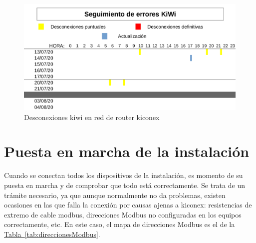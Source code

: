 \clearpage
\vspace*{\fill}
\begin{figure}[H]
  \centering
  \includegraphics[width=\textwidth, keepaspectratio]{img/erroresRedRouter}
  \caption{Desconexiones kiwi en red de router kiconex}
  \label{figura:erroresRouter}
\end{figure}
\vspace*{\fill}
\clearpage

\section{Puesta en marcha de la instalación}
\label{sec:altaInstalacion}

Cuando se conectan todos los dispositivos de la instalación, es momento de su puesta en marcha y de comprobar que todo está correctamente. Se trata de un trámite necesario, ya que aunque normalmente no da problemas, existen ocasiones en las que falla la conexión por causas ajenas a kiconex: resistencias de extremo de cable modbus, direcciones Modbus no configuradas en los equipos correctamente, etc. En este caso, el mapa de direcciones Modbus es el de la \hyperref[tab:direccionesModbus]{Tabla~\ref{tab:direccionesModbus}}.

\vspace*{\fill}

